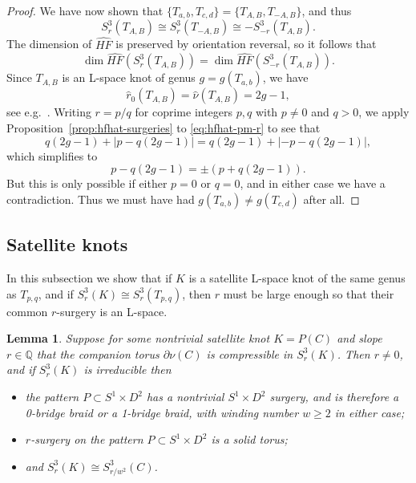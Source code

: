 \documentclass[11pt]{amsart}
\newtheorem {lemma}[theorem]{Lemma}
\numberwithin{equation}{section}
\numberwithin{theorem}{section}
\theoremstyle{definition}
\newcommand{\Q}{\mathbb{Q}}
\newcommand{\hfhat}{\widehat{\mathit{HF}}}
\begin{document}
\begin{proof}
We have now shown that $\{T_{a,b},T_{c,d}\} = \{T_{A,B},T_{-A,B}\}$, and thus
\[ S^3_r(T_{A,B}) \cong S^3_r(T_{-A,B}) \cong -S^3_{-r}(T_{A,B}). \]
The dimension of $\hfhat$ is preserved by orientation reversal, so it follows that
\begin{equation} \label{eq:hfhat-pm-r}
\dim \hfhat(S^3_r(T_{A,B})) = \dim \hfhat(S^3_{-r}(T_{A,B})).
\end{equation}
Since $T_{A,B}$ is an L-space knot of genus $g = g(T_{a,b})$, we have
\[ \hat{r}_0(T_{A,B}) = \hat\nu(T_{A,B}) = 2g-1, \]
see e.g.\ \cite[Remark~10.9]{bs-concordance}.  Writing $r = p/q$ for coprime integers $p,q$ with $p\neq 0$ and $q > 0$, we apply Proposition~\ref{prop:hfhat-surgeries} to \eqref{eq:hfhat-pm-r} to see that
\[ q(2g-1) + |p-q(2g-1)| = q(2g-1) + |{-p}-q(2g-1)|, \]
which simplifies to
\[ p-q(2g-1) = \pm(p+q(2g-1)). \]
But this is only possible if either $p=0$ or $q=0$, and in either case we have a contradiction.  Thus we must have had $g(T_{a,b}) \neq g(T_{c,d})$ after all.
\end{proof}

%
%
%

\subsection{Satellite knots}

In this subsection we show that if $K$ is a satellite L-space knot of the same genus as $T_{p,q}$, and if $S^3_r(K) \cong S^3_r(T_{p,q})$, then $r$ must be large enough so that their common $r$-surgery is an L-space.

\begin{lemma} \label{lem:prelim-satellite-surgeries}
Suppose for some nontrivial satellite knot $K=P(C)$ and slope $r\in\Q$ that the companion torus $\partial \nu(C)$ is compressible in $S^3_r(K)$.  Then $r\neq 0$, and if $S^3_r(K)$ is irreducible then 
\begin{itemize}
\item the pattern $P \subset S^1\times D^2$ has a nontrivial $S^1\times D^2$ surgery, and is therefore a 0-bridge braid or a 1-bridge braid, with winding number $w \geq 2$ in either case;
\item $r$-surgery on the pattern $P \subset S^1\times D^2$ is a solid torus;
\item and $S^3_r(K) \cong S^3_{r/w^2}(C)$.
\end{itemize}
\end{lemma}
\end{document}
